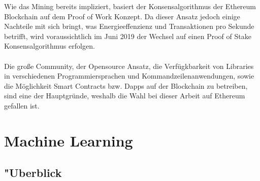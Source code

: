 Wie das Mining bereits impliziert, basiert der Konsensalgorithmus der Ethereum Blockchain auf dem Proof of Work Konzept. Da dieser Ansatz jedoch einige Nachteile mit sich bringt, was Energieeffenzienz und Transaktionen pro Sekunde betrifft, wird voraussichtlich im Juni 2019 der Wechsel auf einen Proof of Stake Konsensalgorithmus erfolgen. \\\\
Die große Community, der Opensource Ansatz, die Verfügkbarkeit von Libraries in verschiedenen Programmiersprachen und Kommandzeilenanwendungen, sowie die Möglichkeit Smart Contracts bzw. Dapps auf der Blockchain zu betreiben, sind eine der Hauptgründe, weshalb die Wahl bei dieser Arbeit auf Ethereum gefallen ist.   



\section{Machine Learning}
\subsection{"Uberblick}

